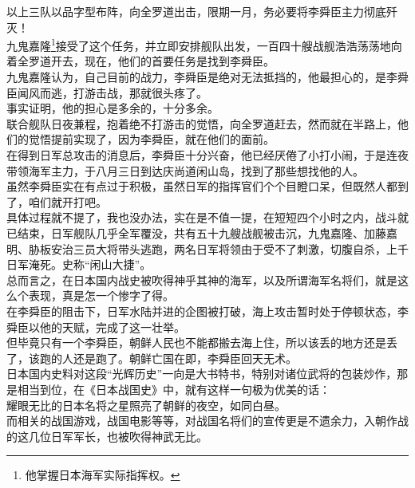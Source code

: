 \begin{multicols}{\theparacolNo}
以上三队以品字型布阵，向全罗道出击，限期一月，务必要将李舜臣主力彻底歼灭！\\

九鬼嘉隆\footnote{他掌握日本海军实际指挥权。}接受了这个任务，并立即安排舰队出发，一百四十艘战舰浩浩荡荡地向着全罗道开去，现在，他们的首要任务是找到李舜臣。\\

九鬼嘉隆认为，自己目前的战力，李舜臣是绝对无法抵挡的，他最担心的，是李舜臣闻风而逃，打游击战，那就很头疼了。\\

事实证明，他的担心是多余的，十分多余。\\

联合舰队日夜兼程，抱着绝不打游击的觉悟，向全罗道赶去，然而就在半路上，他们的觉悟提前实现了，因为李舜臣，就在他们的面前。\\

在得到日军总攻击的消息后，李舜臣十分兴奋，他已经厌倦了小打小闹，于是连夜带领海军主力，于八月三日到达庆尚道闲山岛，找到了那些想找他的人。\\

虽然李舜臣实在有点过于积极，虽然日军的指挥官们个个目瞪口呆，但既然人都到了，咱们就开打吧。\\

具体过程就不提了，我也没办法，实在是不值一提，在短短四个小时之内，战斗就已结束，日军舰队几乎全军覆没，共有五十九艘战舰被击沉，九鬼嘉隆、加藤嘉明、胁板安治三员大将带头逃跑，两名日军将领由于受不了刺激，切腹自杀，上千日军淹死。史称“闲山大捷”。\\

总而言之，在日本国内战史被吹得神乎其神的海军，以及所谓海军名将们，就是这么个表现，真是怎一个惨字了得。\\

在李舜臣的阻击下，日军水陆并进的企图被打破，海上攻击暂时处于停顿状态，李舜臣以他的天赋，完成了这一壮举。\\

但毕竟只有一个李舜臣，朝鲜人民也不能都搬去海上住，所以该丢的地方还是丢了，该跑的人还是跑了。朝鲜亡国在即，李舜臣回天无术。\\

日本国内史料对这段“光辉历史”一向是大书特书，特别对诸位武将的包装炒作，那是相当到位，在《日本战国史》中，就有这样一句极为优美的话：\\

耀眼无比的日本名将之星照亮了朝鲜的夜空，如同白昼。\\

而相关的战国游戏，战国电影等等，对战国名将们的宣传更是不遗余力，入朝作战的这几位日军军长，也被吹得神武无比。\\


\end{multicols}
